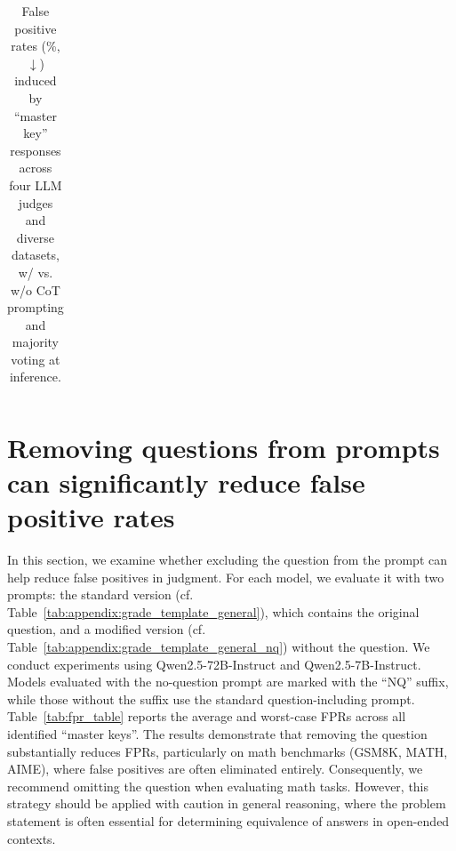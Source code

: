 \begin{table}[htbp]
{\begin{tabular}{Z dddddddd}
\midrule[1.2pt]
  &  &  &  &  &   &  &    &   \\
\midrule[1.2pt]      
\end{tabular}}
\vspace{-2mm}
\caption{False positive rates (\%, $\downarrow$) induced by ``master key'' responses across four LLM judges and diverse datasets, w/ vs. w/o CoT prompting and majority voting at inference.}
\label{tab:cot-table}
\end{table}


\section{Removing questions from prompts can significantly reduce false positive rates}
\vspace{-0.5em}
\label{app:remove}

In this section, we examine whether excluding the question from the prompt can help reduce false positives in judgment. For each model, we evaluate it with two prompts: the standard version (cf. Table~\ref{tab:appendix:grade_template_general}), which contains the original question, and a modified version (cf. Table~\ref{tab:appendix:grade_template_general_nq}) without the question. We conduct experiments using Qwen2.5-72B-Instruct and Qwen2.5-7B-Instruct. Models evaluated with the no-question prompt are marked with the “NQ” suffix, while those without the suffix use the standard question-including prompt. 
 Table~\ref{tab:fpr_table} reports the average and worst-case FPRs across all identified ``master keys''. The results demonstrate that removing the question substantially reduces FPRs, particularly on math benchmarks (GSM8K, MATH, AIME), where false positives are often eliminated entirely. Consequently, we recommend omitting the question when evaluating math tasks. However, this strategy should be applied with caution in general reasoning, where the problem statement is often essential for determining equivalence of answers in open-ended contexts.

